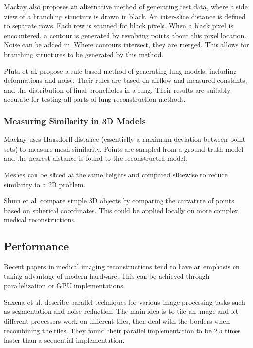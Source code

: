 \documentclass[11p, titlepage]{article}
\begin{document}
Mackay \cite{mackay2019robust} also proposes an alternative method of generating test data, where a side view of a branching structure is drawn in black. An inter-slice distance is defined to separate rows. Each row is scanned for black pixels. When a black pixel is encountered, a contour is generated by revolving points about this pixel location. Noise can be added in. Where contours intersect, they are merged. This allows for branching structures to be generated by this method.

Pluta et al. \cite{pluta2012new} propose a rule-based method of generating lung models, including deformations and noise. Their rules are based on airflow and measured constants, and the distribution of final bronchioles in a lung. Their results are suitably accurate for testing all parts of lung reconstruction methods.

\subsubsection{Measuring Similarity in 3D Models}

Mackay \cite{mackay2019robust} uses Hausdorff distance (essentially a maximum deviation between point sets) to measure mesh similarity. Points are sampled from a ground truth model and the nearest distance is found to the reconstructed model.

Meshes can be sliced at the same heights and compared slicewise to reduce similarity to a 2D problem.

Shum et al. \cite{shum19963d} compare simple 3D objects by comparing the curvature of points based on spherical coordinates. This could be applied locally on more complex medical reconstructions.

\subsection{Performance}

Recent papers in medical imaging reconstructions tend to have an emphasis on taking advantage of modern hardware. This can be achieved through parallelization or GPU implementations.

Saxena et al. \cite{saxena2013image} describe parallel techniques for various image processing tasks such as segmentation and noise reduction. The main idea is to tile an image and let different processors work on different tiles, then deal with the borders when recombining the tiles. They found their parallel implementation to be 2.5 times faster than a sequential implementation.
\end{document}
